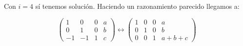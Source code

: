 \documentclass[openany]{book}
\begin{document}
\begin{exercise}
    Con $ i=4$ sí tenemos solución. Haciendo un razonamiento parecido llegamos a:

    $$ 
    \left(\begin{array}{ccc|c}
        1 & 0 & 0 & a\\ 
        0 & 1 & 0 & b\\ 
        -1 & -1 & 1 & c
    \end{array}\right)
    \leftrightarrow 
    \left(\begin{array}{ccc|c}
        1 & 0 & 0 & a\\ 
        0 & 1 & 0 & b\\ 
        0 & 0 & 1 & a+b+c
    \end{array}\right)
    $$

\end{exercise}
\end{document}
